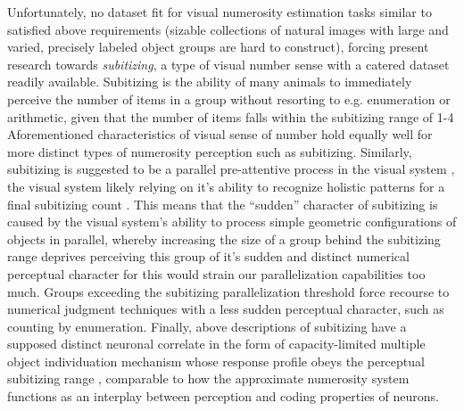\documentclass[twocolumn]{article}
\begin{document}
Unfortunately, no dataset fit for visual numerosity estimation tasks
similar to \citet{stoianov2012} satisfied above requirements (sizable
collections of natural images with large and varied, precisely labeled
object groups are hard to construct), forcing present research towards
\emph{subitizing}, a type of visual number sense with a catered
dataset readily available. Subitizing is the ability of many animals to
immediately perceive the number of items in a group without resorting to e.g. enumeration or arithmetic, given that the number of items falls within the
subitizing range of 1-4 \citep{kaufman1949, animalsnumericalcognition}
Aforementioned characteristics of visual sense of
number hold equally well for more distinct types of numerosity perception such as
subitizing. Similarly, subitizing is suggested to be a parallel
pre-attentive process in the visual system
\citep[p.~57]{dehaene2011number}, the visual system likely relying on
it's ability to recognize holistic patterns for a final subitizing count
\citetext{\citealp{jansen2014role}; \citealp[p.~57]{dehaene2011number}; \citealp{piazza2002subitizing}}.
This means that the ``sudden'' character of subitizing is caused by the
visual system's ability to process simple geometric configurations of
objects in parallel, whereby increasing the size of a group behind the
subitizing range deprives perceiving this group of it's sudden and
distinct numerical perceptual character for this would strain our
parallelization capabilities too much. Groups exceeding the subitizing parallelization threshold force recourse to numerical judgment techniques with a less sudden perceptual character, such as counting by enumeration. Finally, above descriptions of subitizing have a supposed distinct neuronal correlate in the form of capacity-limited multiple object individuation mechanism whose response profile obeys the perceptual subitizing range \citep{poncet2016individuation}, comparable to how the approximate numerosity system functions as an interplay between perception and coding properties of neurons.\\
\end{document}
